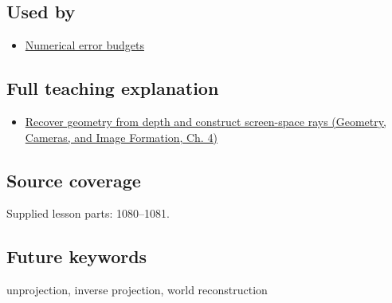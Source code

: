 \subsection{Used by}\label{appendix-2cbf2968e866-used-by}

\begin{itemize}
\tightlist
\item
  \hyperref[appendix-31b8c295e05f]{Numerical error budgets}
\end{itemize}

\subsection{Full teaching explanation}\label{appendix-2cbf2968e866-full-teaching-explanation}

\begin{itemize}
\tightlist
\item
  \href{../03-Geometry-Cameras-and-Image-Formation/main.pdf\#nameddest=02-foundations-ii-ch035-recover-geometry-from-depth-and-construct-screen-space-rays}{Recover geometry from depth and construct screen-space rays (Geometry, Cameras, and Image Formation, Ch. 4)}
\end{itemize}

\subsection{Source coverage}\label{appendix-2cbf2968e866-source-coverage}

Supplied lesson parts: 1080--1081.

\subsection{Future keywords}\label{appendix-2cbf2968e866-future-keywords}

unprojection, inverse projection, world reconstruction
